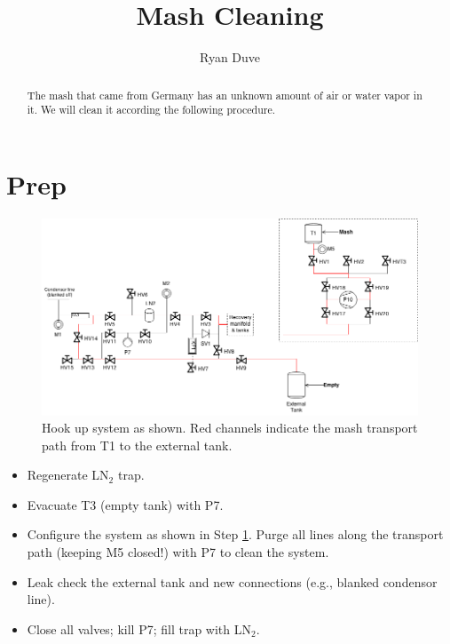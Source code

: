 \documentclass[a4paper,10pt]{article}
\title{Mash Cleaning}
\author{Ryan Duve}
\begin{document}
\maketitle

\begin{abstract}
\vspace{.1cm}
\vspace{.1cm}

The mash that came from Germany has an unknown amount of air or water vapor in it.  We will clean it according the following procedure.

\end{abstract}

\section{Prep}
\begin{figure}[htbp!]
 \centering
 \includegraphics[width=\textwidth]{./mash-cleaning-schematic-1.png}
 \caption{Hook up system as shown.  Red channels indicate the mash transport path from T1 to the external tank.}
 \label{a}
\end{figure}

\begin{itemize}
 \item Regenerate LN$_2$ trap.
 \item Evacuate T3 (empty tank) with P7.
 \item Configure the system as shown in Step \ref{a}. Purge all lines along the transport path (keeping M5 closed!) with P7 to clean the system.
 \item Leak check the external tank and new connections (e.g., blanked condensor line).
 \item Close all valves; kill P7; fill trap with LN$_2$.
\end{itemize}
\end{document}
